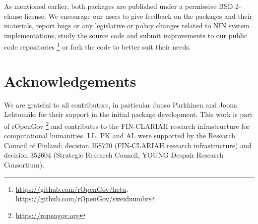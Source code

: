 As mentioned earlier, both packages are published under a permissive BSD 2-clause license. We encourage our users to give feedback on the packages and their materials, report bugs or any legislative or policy changes related to NIN system implementations, study the source code and submit improvements to our public code repositories \footnote{\url{https://github.com/rOpenGov/hetu}, \url{https://github.com/rOpenGov/sweidnumbr}} or fork the code to better suit their needs.

\section{Acknowledgements}\label{acknowledgements}

We are grateful to all contributors, in particular Juuso Parkkinen and Joona Lehtomäki for their support in the initial package development. This work is part of rOpenGov \footnote{\url{https://ropengov.org}} and contributes to the FIN-CLARIAH research infrastructure for computational humanities. LL, PK and AL were supported by the Research Council of Finland: decision 358720 (FIN-CLARIAH research infrastructure) and decision 352604 (Strategic Research Council, YOUNG Despair Research Consortium).



\address{%
Pyry Kantanen\\
\\%
Department of Computing \newline PO Box 20014 University of Turku \newline Finland\\
%
%
\textit{ORCiD: \href{https://orcid.org/0000-0003-2853-2765}{0000-0003-2853-2765}}\\%
\href{mailto:pyry.kantanen@utu.fi}{\nolinkurl{pyry.kantanen@utu.fi}}%
}

\address{%
Erik Bülow\\
\\%
Department of Orthopaedics, Institute of Clinical Sciences \newline Sahlgrenska Academy at University of Gothenburg \newline Sweden\\
%
%
\textit{ORCiD: \href{https://orcid.org/0000-0002-9973-456X}{0000-0002-9973-456X}}\\%
\href{mailto:erik.bulow@gu.se}{\nolinkurl{erik.bulow@gu.se}}%
}

\address{%
Aleksi Lahtinen\\
\\%
Deparment of computing \newline University of Turku \newline Finland\\
%
%
\textit{ORCiD: \href{https://orcid.org/0009-0009-9640-5187}{0009-0009-9640-5187}}\\%
\href{mailto:aleksi.l.lahtinen@utu.fi}{\nolinkurl{aleksi.l.lahtinen@utu.fi}}%
}

